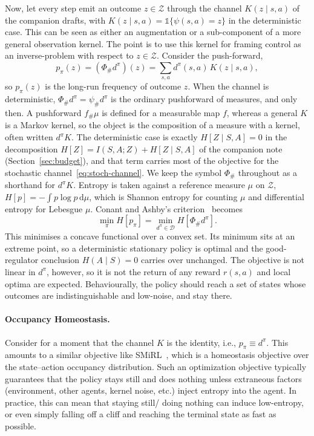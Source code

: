 \documentclass[11pt]{article}
\theoremstyle{remark}
\newcommand{\Zcal}{\mathcal Z}
\newcommand{\Dcal}{\mathcal D}
\newcommand{\1}{\mathds{1}}
\newcommand{\dd}{\mathrm d}
\newcommand{\occ}{d^{\pi}}
\newcommand{\push}{\Phi_{\#}}
\newcommand{\pz}{p_{\pi}}
\newcommand{\Hf}[1]{H\!\left[#1\right]}
\newcommand{\fix}[1]{\textcolor{red!75!black}{#1}}
\begin{document}
Now, let every step emit an outcome $z\in\Zcal$ through the channel $K(z\mid s,a)$ of the companion drafts, with $K(z\mid s,a)=\1\{\psi(s,a)=z\}$ in the deterministic case.
This can be seen as either an augmentation or a sub-component of a more general observation kernel.
The point is to use this kernel for framing control as an inverse-problem with respect to $z\in\Zcal$.
Consider the push-forward,
\begin{equation}
  \pz(z)=(\push\occ)(z)=\sum_{s,a}\occ(s,a)\,K(z\mid s,a),
  \label{eq:push}
\end{equation}
so $\pz(z)$ is the long-run frequency of outcome $z$.
When the channel is deterministic, $\push\occ=\psi_{\#}\occ$ is the ordinary pushforward of measures\fix{, and only then.
A pushforward $f_{\#}\mu$ is defined for a measurable map $f$, whereas a general $K$ is a Markov kernel, so the object is the composition of a measure with a kernel, often written $\occ K$.
The deterministic case is exactly $\Hf{Z\mid S,A}=0$ in the decomposition $\Hf{Z}=I(S,A;Z)+\Hf{Z\mid S,A}$ of the companion note (Section~\ref{sec:budget}), and that term carries most of the objective for the stochastic channel~\eqref{eq:stoch-channel}.
We keep the symbol $\push$ throughout as a shorthand for $\occ K$.}
Entropy is taken against a reference measure $\mu$ on $\Zcal$, $\Hf{p}=-\int p\log p\,\dd\mu$, which is Shannon entropy for counting $\mu$ and differential entropy for Lebesgue $\mu$.
Conant and Ashby's criterion~\citep{Conant-good70} becomes
\begin{equation}
  \min_{\pi}\Hf{\pz}=\min_{\occ\in\Dcal}\Hf{\push\occ}.
  \label{eq:obj}
\end{equation}
This minimises a concave functional over a convex set.
Its minimum sits at an extreme point, so a deterministic stationary policy is optimal and the good-regulator conclusion $H(A\mid S)=0$ carries over unchanged.
The objective is not linear in $\occ$, however, so it is not the return of any reward $r(s,a)$ and local optima are expected.
Behaviourally, the policy should reach a set of states whose outcomes are indistinguishable and low-noise, and stay there.


\paragraph{Occupancy Homeostasis.}
Consider for a moment that the channel $K$ is the identity, i.e., $p_\pi \equiv d^\pi$.
This amounts to a similar objective like SMiRL~\citep{Berseth-smirl21}, which is a homeostasis objective over the state--action occupancy distribution.
Such an optimization objective typically guarantees that the policy stays still and does nothing unless extraneous factors (environment, other agents, kernel noise, etc.) inject entropy into the agent.
In practice, this can mean that staying still/ doing nothing can induce low-entropy, or even simply falling off a cliff and reaching the terminal state as fast as possible.
\end{document}
